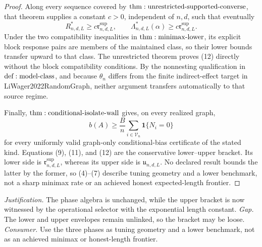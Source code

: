 \documentclass{article}
\begin{document}
\begin{proof}
Along every sequence covered by \({\rm thm:unrestricted\text{-}supported\text{-}converse}\), that theorem supplies a constant \(c>0\), independent of \(n,d\), such that eventually
\[
 R^*_{n,d,L}\geq c\mathfrak r^{\mathrm{sup}}_{n,d,L},
 \qquad
 \Lambda^*_{n,d,L}(\alpha)
 \geq c\mathfrak r^{\mathrm{sup}}_{n,d,L}.
\tag{12}
\]
Under the two compatibility inequalities in \({\rm thm:minimax\text{-}lower}\), its explicit block response pairs are members of the maintained class, so their lower bounds transfer upward to that class.  The unrestricted theorem proves (12) directly without the block compatibility conditions.  By the nonnesting qualification in \({\rm def:model\text{-}class}\), and because \(\theta_n\) differs from the finite indirect-effect target in LiWager2022RandomGraph, neither argument transfers automatically to that source regime.

Finally, \({\rm thm:conditional\text{-}isolate\text{-}wall}\) gives, on every realized graph,
\[
 b(A)\geq\frac Bn\sum_{i\in\mathcal V_n}\mathbf1\{N_i=0\}
\tag{13}
\]
for every uniformly valid graph-only conditional-bias certificate of the stated kind.  Equations (9), (11), and (12) are the conservative lower--upper bracket.  Its lower side is \(\mathfrak r^{\mathrm{sup}}_{n,d,L}\), whereas its upper side is \(\mathfrak u_{n,d,L}\).  No declared result bounds the latter by the former, so (4)--(7) describe tuning geometry and a lower benchmark, not a sharp minimax rate or an achieved honest expected-length frontier.
\end{proof}
\par\smallskip\noindent \textit{Justification.} The phase algebra is unchanged, while the upper bracket is now witnessed by the operational selector with the exponential length constant. \textit{Gap.} The lower and upper envelopes remain unlinked, so the bracket may be loose. \textit{Consumer.} Use the three phases as tuning geometry and a lower benchmark, not as an achieved minimax or honest-length frontier.
\end{document}

